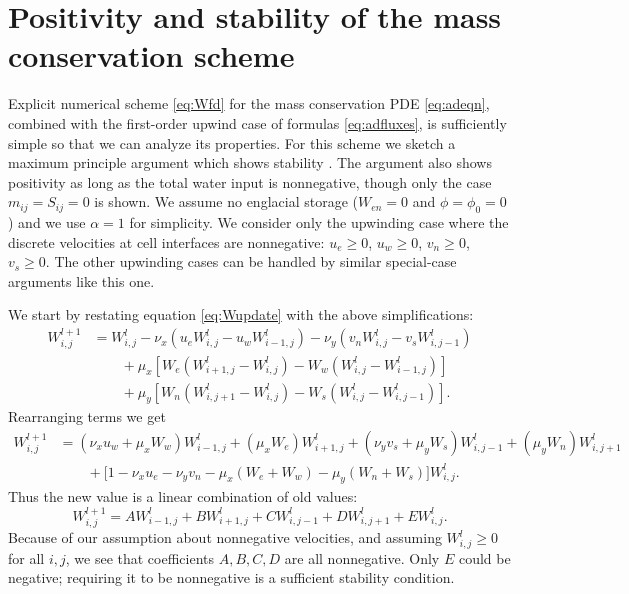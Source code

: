\documentclass[11pt,final]{amsart}
\newcommand{\Wlij}{W^l_{i,j}}
\begin{document}

\small

\normalsize


\appendix

\section{Positivity and stability of the mass conservation scheme}

Explicit numerical scheme \eqref{eq:Wfd} for the mass conservation PDE \eqref{eq:adeqn}, combined with the first-order upwind case of formulas \eqref{eq:adfluxes}, is sufficiently simple so that we can analyze its properties.  For this scheme we sketch a maximum principle argument which shows stability \citep{MortonMayers}.  The argument also shows positivity \citep{HundsdorferVerwer2010} as long as the total water input is nonnegative, though only the case $m_{ij}=S_{ij} = 0$ is shown.  We assume no englacial storage ($W_{en}=0$ and $\phi=\phi_0=0$) and we use $\alpha=1$ for simplicity.  We consider only the upwinding case where the discrete velocities at cell interfaces are nonnegative: $u_e\ge 0$, $u_w\ge 0$, $v_n\ge 0$, $v_s\ge 0$.  The other upwinding cases can be handled by similar special-case arguments like this one.

We start by restating equation \eqref{eq:Wupdate} with the above simplifications:
\begin{align*}
 W_{i,j}^{l+1} &= \Wlij - \nu_x \left(u_e \Wlij - u_w W_{i-1,j}^l\right) - \nu_y \left(v_n \Wlij - v_s W_{i,j-1}^l\right)  \\
      &\qquad + \mu_x \left[W_e \left(W_{i+1,j}^l - \Wlij\right) - W_w \left(\Wlij - W_{i-1,j}^l\right)\right]  \\
      &\qquad + \mu_y \left[W_n \left(W_{i,j+1}^l - \Wlij\right) - W_s \left(\Wlij - W_{i,j-1}^l\right)\right].
\end{align*}
Rearranging terms we get
\begin{align*}
 W_{i,j}^{l+1} &= (\nu_x u_w + \mu_x W_w) W_{i-1,j}^l + (\mu_x W_e) W_{i+1,j}^l + (\nu_y v_s + \mu_y W_s) W_{i,j-1}^l + (\mu_y W_n) W_{i,j+1}^l \\
      &\qquad + \Big[1 - \nu_x u_e - \nu_y v_n - \mu_x (W_e + W_w) - \mu_y (W_n + W_s)\Big] \Wlij.
\end{align*}
Thus the new value is a linear combination of old values:
\begin{equation}
W_{i,j}^{l+1} = A W_{i-1,j}^l + B W_{i+1,j}^l + C W_{i,j-1}^l + D W_{i,j+1}^l + E \Wlij. \label{eq:lincomb}
\end{equation}
Because of our assumption about nonnegative velocities, and assuming $\Wlij \ge 0$ for all $i,j$, we see that coefficients $A,B,C,D$ are all nonnegative.  Only $E$ could be negative; requiring it to be nonnegative is a sufficient stability condition.
\end{document}
